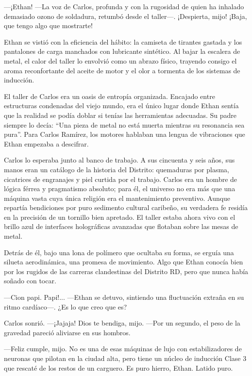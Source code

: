 \documentclass[11pt,twoside]{book}
\begin{document}
---¡Ethan! ---La voz de Carlos, profunda y con la rugosidad de quien ha inhalado demasiado ozono de soldadura, retumbó desde el taller---. ¡Despierta, mijo! ¡Baja, que tengo algo que mostrarte!

Ethan se vistió con la eficiencia del hábito: la camiseta de tirantes gastada y los pantalones de carga manchados con lubricante sintético. Al bajar la escalera de metal, el calor del taller lo envolvió como un abrazo físico, trayendo consigo el aroma reconfortante del aceite de motor y el olor a tormenta de los sistemas de inducción.

El taller de Carlos era un oasis de entropía organizada. Encajado entre estructuras condenadas del viejo mundo, era el único lugar donde Ethan sentía que la realidad se podía doblar si tenías las herramientas adecuadas. Su padre siempre lo decía: ``Una pieza de metal no está muerta mientras su resonancia sea pura''. Para Carlos Ramírez, los motores hablaban una lengua de vibraciones que Ethan empezaba a descifrar.

Carlos lo esperaba junto al banco de trabajo. A sus cincuenta y seis años, sus manos eran un catálogo de la historia del Distrito: quemaduras por plasma, cicatrices de engranajes y piel curtida por el trabajo. Carlos era un hombre de lógica férrea y pragmatismo absoluto; para él, el universo no era más que una máquina vasta cuya única religión era el mantenimiento preventivo. Aunque repartía bendiciones por puro sedimento cultural caribeño, su verdadera fe residía en la precisión de un tornillo bien apretado. El taller estaba ahora vivo con el brillo azul de interfaces holográficas avanzadas que flotaban sobre las mesas de metal.

Detrás de él, bajo una lona de polímero que ocultaba su forma, se erguía una silueta aerodinámica, una promesa de movimiento. Algo que Ethan conocía bien por los rugidos de las carreras clandestinas del Distrito RD, pero que nunca había soñado con tocar.

---Cion papi. Papi!... ---Ethan se detuvo, sintiendo una fluctuación extraña en su ritmo cardíaco---. ¿Es lo que creo que es?

Carlos sonrió. ---¡Jajaja! Dios te bendiga, mijo. ---Por un segundo, el peso de la gravedad pareció aliviarse en sus hombros.

---Feliz cumple, mijo. No es una de esas máquinas de lujo con estabilizadores de neuronas que pilotan en la ciudad alta, pero tiene un núcleo de inducción Clase 3 que rescaté de los restos de un carguero. Es puro hierro, Ethan. Latido puro.
\end{document}
